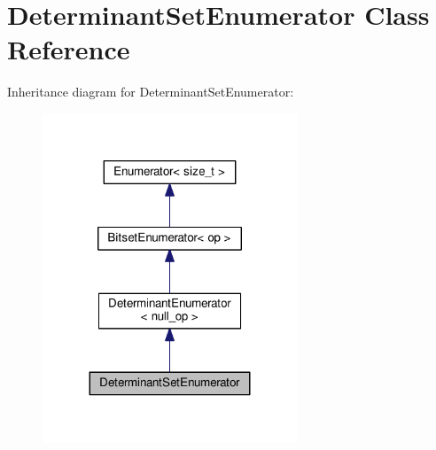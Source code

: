 \hypertarget{classDeterminantSetEnumerator}{}\section{Determinant\+Set\+Enumerator Class Reference}
\label{classDeterminantSetEnumerator}


Inheritance diagram for Determinant\+Set\+Enumerator\+:\nopagebreak
\begin{figure}[H]
\begin{center}
\leavevmode
\includegraphics[width=215pt]{classDeterminantSetEnumerator__inherit__graph}
\end{center}
\end{figure}


